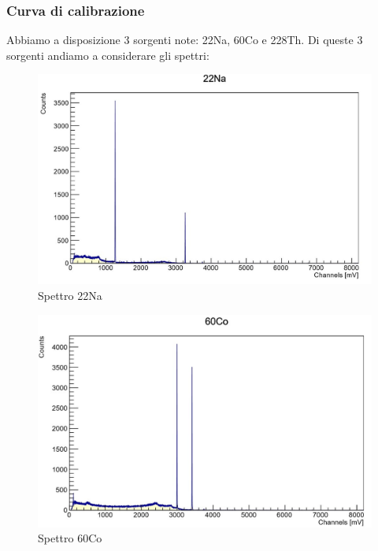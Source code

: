\documentclass[a4paper,10pt]{article}
\begin{document}
\subsubsection{Curva di calibrazione}
Abbiamo a disposizione 3 sorgenti note: 22Na, 60Co e 228Th. Di queste 3 sorgenti andiamo a considerare gli spettri:

\begin{figure}[!h]
    \centering
    \includegraphics[scale=0.6]{grafici/sodiocompleto}
    \caption{Spettro 22Na}
\end{figure}
\newpage
\begin{figure}[!h]
    \centering
    \includegraphics[scale=0.6]{grafici/cobaltocompleto}
    \caption{Spettro 60Co}
\end{figure}
\end{document}
